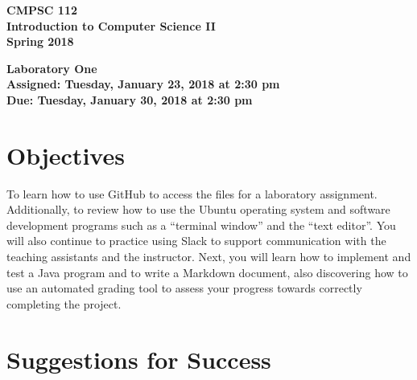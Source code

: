 \documentclass[11pt]{article}
\newcommand{\assignmentduedate}{January 30}
\newcommand{\assignmentassignedate}{January 23}
\newcommand{\assignmentnumber}{One}
\newcommand{\labyear}{2018}
\newcommand{\labday}{Tuesday}
\newcommand{\labtime}{2:30 pm}
\newcommand{\assigneddate}{Assigned: \labday, \assignmentassignedate, \labyear{} at \labtime{}}
\newcommand{\duedate}{Due: \labday, \assignmentduedate, \labyear{} at \labtime{}}
\newcommand{\labtitle}[1]
{
  \begin{center}
    \begin{center}
      \bf
      CMPSC 112\\Introduction to Computer Science II\\
      Spring 2018\\
      \medskip
    \end{center}
    \bf
    #1
  \end{center}
}
\begin{document}
\thispagestyle{empty}

\labtitle{Laboratory \assignmentnumber{} \\ \assigneddate{} \\ \duedate{}}

\section*{Objectives}

To learn how to use GitHub to access the files for a laboratory assignment. Additionally, to review how to use the
Ubuntu operating system and software development programs such as a ``terminal window'' and the ``text editor''. You
will also continue to practice using Slack to support communication with the teaching assistants and the instructor.
Next, you will learn how to implement and test a Java program and to write a Markdown document, also discovering how to
use an automated grading tool to assess your progress towards correctly completing the project.

\section*{Suggestions for Success}
\end{document}
